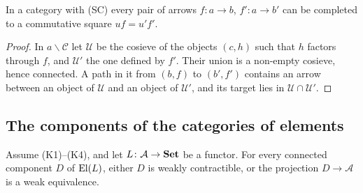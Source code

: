 \begin{lemma}\label{lem:squares}
In a category with \textup{(SC)} every pair of arrows $f\colon a\to b$,
$f'\colon a\to b'$ can be completed to a commutative square $uf=u'f'$.
\end{lemma}

\begin{proof}
In $a\backslash\mathcal C$ let $\mathcal U$ be the cosieve of the objects
$(c,h)$ such that $h$ factors through $f$, and $\mathcal U'$ the one defined by
$f'$. Their union is a non-empty cosieve, hence connected. A path in it from
$(b,f)$ to $(b',f')$ contains an arrow between an object of $\mathcal U$ and an
object of $\mathcal U'$, and its target lies in $\mathcal U\cap\mathcal U'$.
\end{proof}

\subsection{The components of the categories of elements}

\begin{proposition}\label{prop:reduction}
Assume \textup{(K1)--(K4)}, and let $L\colon\mathcal A\to\mathbf{Set}$ be a functor. For
every connected component $D$ of $\operatorname{El}(L)$, either $D$ is weakly contractible,
or the projection $D\to\mathcal A$ is a weak equivalence.
\end{proposition}

